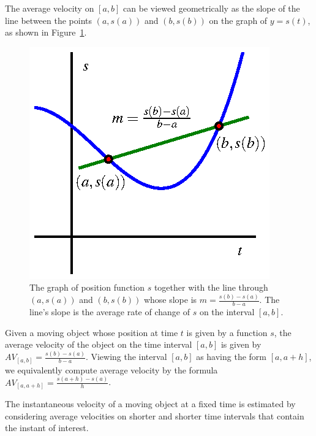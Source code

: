 


\begin{summary}
\item The average velocity on $[a,b]$ can be viewed geometrically as the slope of the line between the points $(a,s(a))$ and $(b,s(b))$ on the graph of $y = s(t)$, as shown in Figure~\ref{F:1.1.Summary}.
\begin{figure}[h]
\begin{center}
\includegraphics{figures/1_1_Summary.eps}
\caption{The graph of position function $s$ together with the line through $(a,s(a))$ and $(b,s(b))$ whose slope is $m = \frac{s(b)-s(a)}{b-a}$.  The line's slope is the average rate of change of $s$ on the interval $[a,b]$.} \label{F:1.1.Summary}
\end{center}
\end{figure}

\item Given a moving object whose position at time $t$ is given by a function $s$, the average velocity of the object on the time interval $[a,b]$ is given by $AV_{[a,b]} = \frac{s(b) - s(a)}{b-a}$.  Viewing the interval $[a,b]$ as having the form $[a,a+h]$, we equivalently compute average velocity by the formula $AV_{[a,a+h]} = \frac{s(a+h) - s(a)}{h}$.
\item The instantaneous velocity of a moving object at a fixed time is estimated by considering average velocities on shorter and shorter time intervals that contain the instant of interest.
\end{summary}

\nin \hrulefill

 

\clearpage
